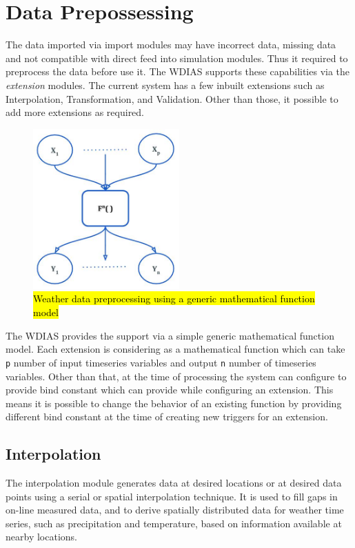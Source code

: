 \section{Data Prepossessing}
\label{se:data_preprocess}

The data imported via import modules may have incorrect data, missing data and not compatible with direct feed into simulation modules. 
Thus it required to preprocess the data before use it. The WDIAS supports these capabilities via the \emph{extension} modules. The current system has a few inbuilt extensions such as Interpolation, Transformation, and Validation. Other than those, it possible to add more extensions as required.
\begin{figure}[htp]
    \centering
    \includegraphics[width=0.5\textwidth]{method/data_preprocess/weather_data_preprocessing.jpg}
    \caption{\hl{Weather data preprocessing using a generic mathematical function model}}
    \label{fi:weather_data_preprocessing}
\end{figure}

The WDIAS provides the support via a simple generic mathematical function model. Each extension is considering as a mathematical function which can take \texttt{p} number of input timeseries variables and output \texttt{n} number of timeseries variables. Other than that, at the time of processing the system can configure to provide bind constant which can provide while configuring an extension. This means it is possible to change the behavior of an existing function by providing different bind constant at the time of creating new triggers for an extension.

\subsection{Interpolation}
The interpolation module generates data at desired locations or at desired data points using a serial or spatial interpolation technique. It is used to fill gaps in on-line measured data, and to derive spatially distributed data for weather time series, such as precipitation and temperature, based on information available at nearby locations.

